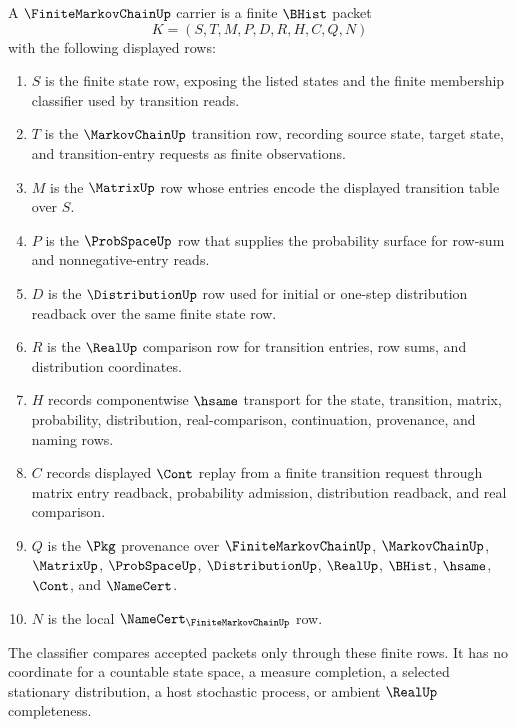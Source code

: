 \begin{definition}
\label{def:finite-markov-chain-carrier}
A $\FiniteMarkovChainUp$ carrier is a finite $\BHist$ packet
$$
K=(S,T,M,P,D,R,H,C,Q,N)
$$
with the following displayed rows:
\begin{enumerate}
\item $S$ is the finite state row, exposing the listed states and the finite
membership classifier used by transition reads.
\item $T$ is the $\MarkovChainUp$ transition row, recording source state,
target state, and transition-entry requests as finite observations.
\item $M$ is the $\MatrixUp$ row whose entries encode the displayed transition
table over $S$.
\item $P$ is the $\ProbSpaceUp$ row that supplies the probability surface for
row-sum and nonnegative-entry reads.
\item $D$ is the $\DistributionUp$ row used for initial or one-step
distribution readback over the same finite state row.
\item $R$ is the $\RealUp$ comparison row for transition entries, row sums,
and distribution coordinates.
\item $H$ records componentwise $\hsame$ transport for the state, transition,
matrix, probability, distribution, real-comparison, continuation, provenance,
and naming rows.
\item $C$ records displayed $\Cont$ replay from a finite transition request
through matrix entry readback, probability admission, distribution readback,
and real comparison.
\item $Q$ is the $\Pkg$ provenance over $\FiniteMarkovChainUp$,
$\MarkovChainUp$, $\MatrixUp$, $\ProbSpaceUp$, $\DistributionUp$, $\RealUp$,
$\BHist$, $\hsame$, $\Cont$, and $\NameCert$.
\item $N$ is the local $\NameCert_{\FiniteMarkovChainUp}$ row.
\end{enumerate}
The classifier compares accepted packets only through these finite rows. It
has no coordinate for a countable state space, a measure completion, a selected
stationary distribution, a host stochastic process, or ambient $\RealUp$
completeness.
\end{definition}

